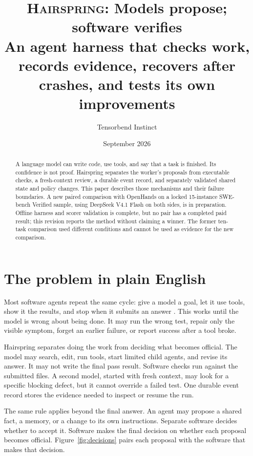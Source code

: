 \documentclass[10pt,letterpaper]{article}
\title{\vspace{-0.4in}\textsc{Hairspring}: Models propose; software verifies\\[6pt]\large An agent harness that checks work, records evidence, recovers after crashes, and tests its own improvements}
\author{Tensorbend Instinct}
\date{September 2026}
\begin{document}
\maketitle
\begin{abstract}
A language model can write code, use tools, and say that a task is finished. Its confidence is not proof. Hairspring separates the worker's proposals from executable checks, a fresh-context review, a durable event record, and separately validated shared state and policy changes. This paper describes those mechanisms and their failure boundaries. A new paired comparison with OpenHands on a locked 15-instance SWE-bench Verified sample, using DeepSeek V4.1 Flash on both sides, is in preparation. Offline harness and scorer validation is complete, but no pair has a completed paid result; this revision reports the method without claiming a winner. The former ten-task comparison used different conditions and cannot be used as evidence for the new comparison.
\end{abstract}

\section{The problem in plain English}
Most software agents repeat the same cycle: give a model a goal, let it use tools, show it the results, and stop when it submits an answer \cite{react,sweagent}. This works until the model is wrong about being done. It may run the wrong test, repair only the visible symptom, forget an earlier failure, or report success after a tool broke.

Hairspring separates doing the work from deciding what becomes official. The model may search, edit, run tools, start limited child agents, and revise its answer. It may not write the final pass result. Software checks run against the submitted files. A second model, started with fresh context, may look for a specific blocking defect, but it cannot override a failed test. One durable event record stores the evidence needed to inspect or resume the run.

The same rule applies beyond the final answer. An agent may propose a shared fact, a memory, or a change to its own instructions. Separate software decides whether to accept it. Software makes the final decision on whether each proposal becomes official. Figure~\ref{fig:decisions} pairs each proposal with the software that makes that decision.
\end{document}
